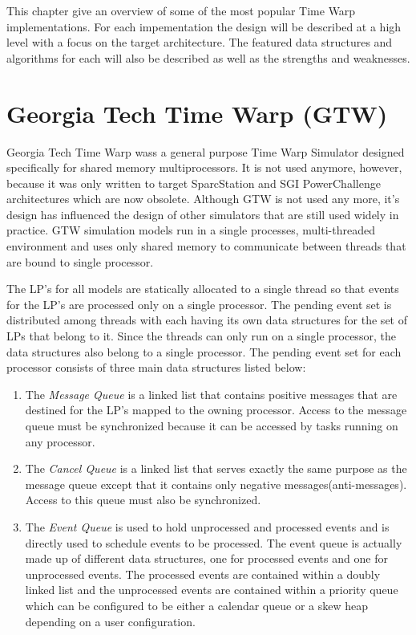\documentclass[11pt]{book}
\begin{document}
This chapter give an overview of some of the most popular Time Warp implementations. For each
impementation the design will be described at a high level with a focus on the target
architecture. The featured data structures and algorithms for each will also be described
as well as the strengths and weaknesses.

\section{Georgia Tech Time Warp (GTW)}

Georgia Tech Time Warp wass a general purpose Time Warp Simulator designed specifically for
shared memory multiprocessors. It is not used anymore, however, because it was only written
to target SparcStation and SGI PowerChallenge architectures which are now obsolete. Although
GTW is not used any more, it's design has influenced the design of other simulators that are
still used widely in practice. GTW simulation models run in a single processes, multi-threaded
environment and uses only shared memory to communicate between threads that are bound to single
processor.

The LP's for all models are statically allocated to a single thread so that events for the
LP's are processed only on a single processor. The pending event set is distributed among
threads with each having its own data structures for the set of LPs that belong to it.
Since the threads can only run on a single processor, the data structures also belong to a
single processor. The pending event set for each processor consists of three main data structures
listed below\cite{das-94}:

\begin{enumerate}
    \item The \emph{Message Queue} is a linked list that contains positive messages that
        are destined for the LP's mapped to the owning processor. Access to the message
        queue must be synchronized because it can be accessed by tasks running on any processor.
    \item The \emph{Cancel Queue} is a linked list that serves exactly the same purpose as
        the message queue except that it contains only negative messages(anti-messages).
        Access to this queue must also be synchronized.
    \item The \emph{Event Queue} is used to hold unprocessed and processed events and is
        directly used to schedule events to be processed. The event queue is actually made
        up of different data structures, one for processed events and one for unprocessed
        events. The processed events are contained within a doubly linked list and the
        unprocessed events are contained within a priority queue which can be configured to
        be either a calendar queue or a skew heap depending on a user configuration.
\end{enumerate}
\end{document}
